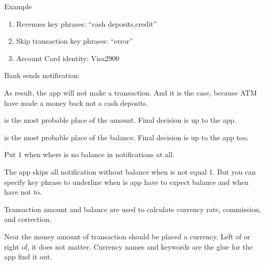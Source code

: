 \documentclass[a4paper,10pt,english]{sphinxmanual}
\begin{document}
\sphinxAtStartPar
Example
\begin{enumerate}
%
\item {} 
\sphinxAtStartPar
Revenues key phrases: “cash deposits,credit”

\item {} 
\sphinxAtStartPar
Skip transaction key phrases: “error”

\item {} 
\sphinxAtStartPar
Account Card identity: Visa2900

\end{enumerate}

\sphinxAtStartPar
Bank sends notification:

\begin{sphinxVerbatim}[commandchars=\\\{\}]
             
\end{sphinxVerbatim}

\sphinxAtStartPar
As result, the app will not make a transaction. And it is the case, because ATM have made a money back not
a cash deposits.

\sphinxAtStartPar
{} is the most probable place of the amount. Final
decision is up to the app.

\sphinxAtStartPar
{} is the most probable place of the balance. Final
decision is up to the app too.

\sphinxAtStartPar
Put \sphinxhyphen{}1 when where is no balance in notifications at all.

\sphinxAtStartPar
The app skips all notification without balance when  is not equal \sphinxhyphen{}1.
But you can specify key phrase to underline when is app have to expect balance and when have not to.

\sphinxAtStartPar
Transaction amount and balance are used to calculate currency rate, commission, and correction.

\sphinxAtStartPar
Near the money amount of transaction should be placed a currency. Left of or right of, it does not matter.
Currency names and keywords are the glue for the app find it out.
\end{document}
